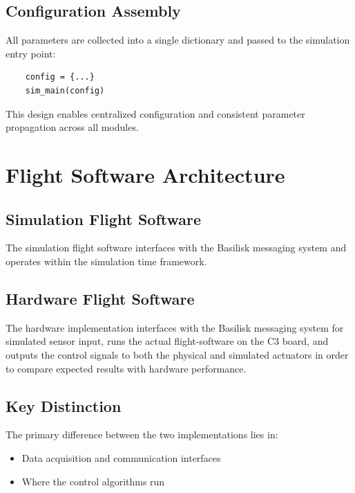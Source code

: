 \subsection{Configuration Assembly}

All parameters are collected into a single dictionary and passed to the simulation entry point:

\begin{verbatim}
	config = {...}
	sim_main(config)
\end{verbatim}

This design enables centralized configuration and consistent parameter propagation across all modules.


\section{Flight Software Architecture}

\subsection{Simulation Flight Software}

The simulation flight software interfaces with the Basilisk messaging system and operates within the simulation time framework.

\subsection{Hardware Flight Software}

The hardware implementation interfaces with the Basilisk messaging system for simulated sensor input, runs the actual flight-software on the C3 board, and outputs the control signals to both the physical and simulated actuators in order to compare expected results with hardware performance.

\subsection{Key Distinction}

The primary difference between the two implementations lies in:

\begin{itemize}
	\item Data acquisition and communication interfaces
	\item Where the control algorithms run
\end{itemize}


